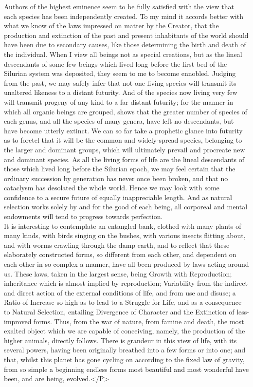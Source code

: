 \indent Authors of the highest eminence seem to be fully satisfied with the view that each species has been independently created. To my mind it accords better with what we know of the laws impressed on matter by the Creator, that the production and extinction of the past and present inhabitants of the world should have been due to secondary causes, like those determining the birth and death of the individual. When I view all beings not as special creations, but as the lineal descendants of some few beings which lived long before the first bed of the Silurian system was deposited, they seem to me to become ennobled. Judging from the past, we may safely infer that not one living species will transmit its unaltered likeness to a distant futurity. And of the species now living very few will transmit progeny of any kind to a far distant futurity; for the manner in which all organic beings are grouped, shows that the greater number of species of each genus, and all the species of many genera, have left no descendants, but have become utterly extinct. We can so far take a prophetic glance into futurity as to foretel that it will be the common and widely-spread species, belonging to the larger and dominant groups, which will ultimately prevail and procreate new and dominant species. As all the living forms of life are the lineal descendants of those which lived long before the Silurian epoch, we may feel certain that the ordinary succession by generation has never once been broken, and that no cataclysm has desolated the whole world. Hence we may look with some confidence to a secure future of equally inappreciable length. And as natural selection works solely by and for the good of each being, all corporeal and mental endowments will tend to progress towards perfection.~\\
\indent It is interesting to contemplate an entangled bank, clothed with many plants of many kinds, with birds singing on the bushes, with various insects flitting about, and with worms crawling through the damp earth, and to reflect that these elaborately constructed forms, so different from each other, and dependent on each other in so complex a manner, have all been produced by laws acting around us.  These laws, taken in the largest sense, being Growth with Reproduction; inheritance which is almost implied by reproduction; Variability from the indirect and direct action of the external conditions of life, and from use and disuse; a Ratio of Increase so high as to lead to a Struggle for Life, and as a consequence to Natural Selection, entailing Divergence of Character and the Extinction of less-improved forms. Thus, from the war of nature, from famine and death, the most exalted object which we are capable of conceiving, namely, the production of the higher animals, directly follows. There is grandeur in this view of life, with its several powers, having been originally breathed into a few forms or into one; and that, whilst this planet has gone cycling on according to the fixed law of gravity, from so simple a beginning endless forms most beautiful and most wonderful have been, and are being, evolved.</P>